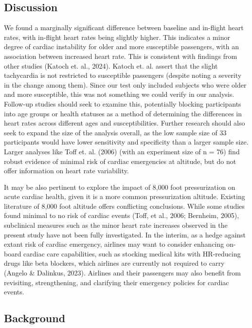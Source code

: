 \documentclass{article}
\begin{document}
\begin{enumerate}
			\subsection*{Discussion}
			We found a marginally significant difference between baseline and in-flight heart rates, with in-flight heart rates being slightly higher. This indicates a minor degree of cardiac instability for older and more susceptible passengers, with an association between increased heart rate. This is consistent with findings from other studies (Katoch et. al., 2024). Katoch et. al. assert that the slight tachycardia is not restricted to susceptible passengers (despite noting a severity in the change among them). Since our test only included subjects who were older and more susceptible, this was not something we could verify in our analysis. Follow-up studies should seek to examine this, potentially blocking participants into age groups or health statuses as a method of determining the differences in heart rates across different ages and susceptibilities. Further research should also seek to expand the size of the analysis overall, as the low sample size of 33 participants would have lower sensitivity and specificity than a larger sample size. Larger analyses like Toff et. al. (2006) (with an experiment size of n = 76) find robust evidence of minimal risk of cardiac emergencies at altitude, but do not offer information on heart rate variability.

			It may be also pertinent to explore the impact of 8,000 foot pressurization on acute cardiac health, given it is a more common pressurization altitude. Existing literature of 8,000 foot altitude offers conflicting conclusions. While some studies found minimal to no risk of cardiac events (Toff, et al., 2006; Bernheim, 2005), subclinical measures such as the minor heart rate increases observed in the present study have not been fully investigated. In the interim, as a hedge against extant risk of cardiac emergency, airlines may want to consider enhancing on-board cardiac care capabilities, such as stocking medical kits with HR-reducing drugs like beta blockers, which airlines are currently not required to carry (Angelo \& Dalinkus, 2023). Airlines and their passengers may also benefit from revisiting, strengthening, and clarifying their emergency policies for cardiac events.
		\newpage

		\subsection*{Background}
		

\end{enumerate}
\end{document}
